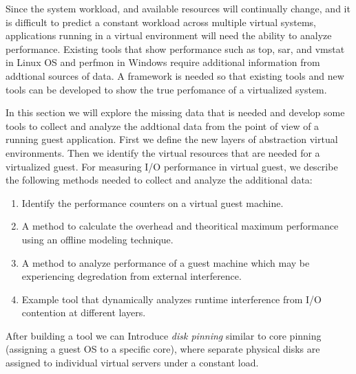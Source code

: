 Since the system workload, and available resources will continually change, and it is difficult to predict a constant workload across multiple virtual systems, applications running in a virtual environment will need the ability to analyze performance.  Existing tools that show performance such as top, sar, and vmstat in Linux OS and perfmon in Windows require additional information from addtional sources of data.  A framework is needed so that existing tools and new tools can be developed to show the true perfomance of a virtualized system.

\indent  In this section we will explore the missing data that is needed and develop some tools to collect and analyze the addtional data from the point of view of a running guest application. First we define the new layers of abstraction virtual environments.  Then we identify the virtual resources that are needed for a virtualized guest.  For measuring I/O performance in virtual guest, we describe the following methods needed to collect and analyze the additional data:
\begin {enumerate}
\item Identify the performance counters on a virtual guest machine.
\item A method to calculate the overhead and theoritical maximum performance using an offline modeling technique.
\item A method to analyze performance of a guest machine which may be experiencing degredation from external interference.
\item Example tool that dynamically analyzes runtime interference from I/O contention at different layers.
\end{enumerate}

After building a tool we can Introduce \emph{disk pinning} similar to core pinning (assigning a guest OS to a specific core), where separate physical disks are assigned to individual virtual servers under a constant load.  

